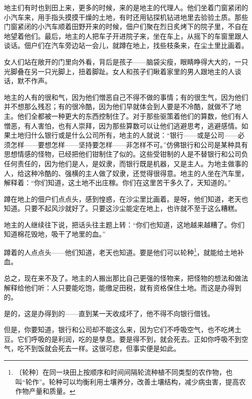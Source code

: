 \documentclass[12pt,UTF-8,openany]{ctexbook}
\begin{document}
\begin{normalsize}
    
    地主们有时也到田上来，更多的时候，来的是地主的代理人。他们坐着门窗紧闭的小汽车来，用手指头摸摸干燥的土地，有时还用钻探机钻进地里去验验土质。那些门窗紧闭的小汽车顺着田野开来的时候，佃户们聚在烈日炙烤下的院子里，不自在地望着他们。最后，地主的人把车子开进院子来，坐在车上，从摇下的车窗里跟人谈话。佃户们在汽车旁边站一会儿，就蹲在地上，找些枝条来，在尘土里比画着。
    
    女人们站在敞开的门里向外看，背后是孩子——脑袋尖瘦，眼睛睁得大大的，一只光脚叠在另一只光脚上，扭着脚趾。女人和孩子们瞅着家里的男人跟地主的人谈话，默不作声。
    
    地主的人有的很和气，因为他们憎恶自己不得不做的事情；有的很生气，因为他们并不想那么残忍；有的很冷酷，因为他们早就体会到人要是不冷酷，就做不了地主。他们全都被一种更大的东西控制住了。对于那些驱策着他们的算数，他们有人憎恶，有人害怕，也有人崇拜，因为那些算数可以让他们逃避思考，逃避感情。如果土地归什么银行或是什么公司所有，地主的人就说：“银行——或是公司——必须怎样——要想怎样——坚持要怎样——非怎样不可。”仿佛银行和公司是某种具有思想情感的怪物，已经把他们钳制住了似的。这些受钳制的人是不替银行和公司负任何责任的，因为他们是人，是奴隶，而银行既是机器，又是主人。为地主做事的人，给这种冷酷的、强横的主人做了奴隶，还觉得很得意。地主的人坐在汽车里，解释着：“你们知道，这土地不出庄稼。你们在这里苦干多久了，天知道的。”
    
    蹲在地上的佃户们点点头，感到惶惑，在沙尘里比画着。是呀，他们知道，老天也知道。只要不起风沙就好了。只要这沙尘能定在地上，也许就不至于这么糟糕。
    
    地主的人继续往下说，把话头往主题上转：“你们也知道，这地越来越糟了。你们知道棉花毁地，吸干了地里的血。”
    
    蹲着的人点点头——他们知道，老天也知道。要是他们可以轮种\footnote{〔轮种〕在同一块田上按顺序和时间间隔轮流种植不同类型的农作物，也叫“轮作”。轮种可以均衡利用土壤养分，改善土壤结构，减少病虫害，提高农作物产量和质量。}，就能给土地补血。
    
    总之，现在来不及了。地主的人搬出那比自己更强的怪物来，把怪物的想法和做法解释给他们听：人只要能吃饱，能缴足田税，就有资格保住土地。而这是办得到的。
    
    是的，这是办得到的——直到某一天收成坏了，他不得不向银行借钱。
    
    但是，你要知道，银行和公司却不能这么来，因为它们不呼吸空气，也不吃烤土豆。它们呼吸的是利润，吃的是孳息。要是得不到，就会死去。正如你呼吸不到空气，吃不到饭就会死去一样。这很可悲，但事实便是如此。
    

\end{normalsize}
\end{document}
